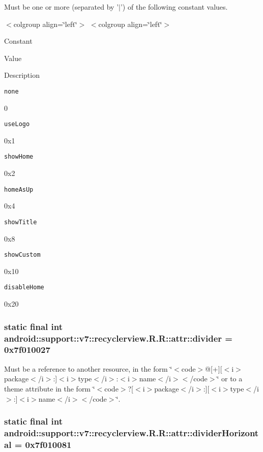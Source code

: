 Must be one or more (separated by '$|$') of the following constant values. \begin{TabularC}{0}
\hline
\end{TabularC}
$<$colgroup align=\char`\"{}left\char`\"{}$>$ $<$colgroup align=\char`\"{}left\char`\"{}$>$ 

Constant

Value

Description 

{\tt none}

0

{\tt useLogo}

0x1

{\tt showHome}

0x2

{\tt homeAsUp}

0x4

{\tt showTitle}

0x8

{\tt showCustom}

0x10

{\tt disableHome}

0x20\hypertarget{classandroid_1_1support_1_1v7_1_1recyclerview_1_1_r_1_1attr_d19aef516697bad6154811774e704939}{
\subsubsection[{divider}]{\setlength{\rightskip}{0pt plus 5cm}static final int android::support::v7::recyclerview.R.R::attr::divider = 0x7f010027}}
\label{classandroid_1_1support_1_1v7_1_1recyclerview_1_1_r_1_1attr_d19aef516697bad6154811774e704939}


Must be a reference to another resource, in the form \char`\"{}$<$code$>$@\mbox{[}+\mbox{]}\mbox{[}$<$i$>$package$<$/i$>$:\mbox{]}$<$i$>$type$<$/i$>$:$<$i$>$name$<$/i$>$$<$/code$>$\char`\"{} or to a theme attribute in the form \char`\"{}$<$code$>$?\mbox{[}$<$i$>$package$<$/i$>$:\mbox{]}\mbox{[}$<$i$>$type$<$/i$>$:\mbox{]}$<$i$>$name$<$/i$>$$<$/code$>$\char`\"{}. \hypertarget{classandroid_1_1support_1_1v7_1_1recyclerview_1_1_r_1_1attr_368a2df762352229054301f3b88e13ff}{
\subsubsection[{dividerHorizontal}]{\setlength{\rightskip}{0pt plus 5cm}static final int android::support::v7::recyclerview.R.R::attr::dividerHorizontal = 0x7f010081}}
\label{classandroid_1_1support_1_1v7_1_1recyclerview_1_1_r_1_1attr_368a2df762352229054301f3b88e13ff}



